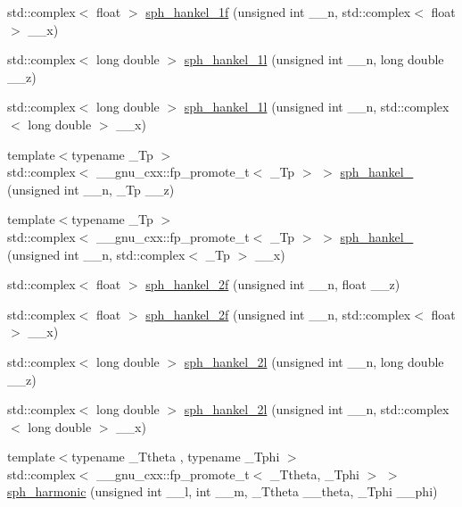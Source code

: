 \begin{DoxyCompactItemize}
std\+::complex$<$ float $>$ \hyperlink{group__gnu__math__spec__func_gadbb875cd50abb62ac75386143486bb2c}{sph\+\_\+hankel\+\_\+1f} (unsigned int \+\_\+\+\_\+n, std\+::complex$<$ float $>$ \+\_\+\+\_\+x)
\item 
std\+::complex$<$ long double $>$ \hyperlink{group__gnu__math__spec__func_ga6e77fd5cddfbd57d9120b20fc6c30e6f}{sph\+\_\+hankel\+\_\+1l} (unsigned int \+\_\+\+\_\+n, long double \+\_\+\+\_\+z)
\item 
std\+::complex$<$ long double $>$ \hyperlink{group__gnu__math__spec__func_ga3e9d889d8f2e4792e892b12b1f5948b9}{sph\+\_\+hankel\+\_\+1l} (unsigned int \+\_\+\+\_\+n, std\+::complex$<$ long double $>$ \+\_\+\+\_\+x)
\item 
{\footnotesize template$<$typename \+\_\+\+Tp $>$ }\\std\+::complex$<$ \+\_\+\+\_\+gnu\+\_\+cxx\+::fp\+\_\+promote\+\_\+t$<$ \+\_\+\+Tp $>$ $>$ \hyperlink{group__gnu__math__spec__func_ga1ca08866a25e3637b04c57ff5a0c36a5}{sph\+\_\+hankel\+\_} (unsigned int \+\_\+\+\_\+n, \+\_\+\+Tp \+\_\+\+\_\+z)
\item 
{\footnotesize template$<$typename \+\_\+\+Tp $>$ }\\std\+::complex$<$ \+\_\+\+\_\+gnu\+\_\+cxx\+::fp\+\_\+promote\+\_\+t$<$ \+\_\+\+Tp $>$ $>$ \hyperlink{group__gnu__math__spec__func_ga0e7d9b5a93ab1d1040040f0ef44590de}{sph\+\_\+hankel\+\_} (unsigned int \+\_\+\+\_\+n, std\+::complex$<$ \+\_\+\+Tp $>$ \+\_\+\+\_\+x)
\item 
std\+::complex$<$ float $>$ \hyperlink{group__gnu__math__spec__func_ga9496b81f94b8ba0162cf45df72be1e71}{sph\+\_\+hankel\+\_\+2f} (unsigned int \+\_\+\+\_\+n, float \+\_\+\+\_\+z)
\item 
std\+::complex$<$ float $>$ \hyperlink{group__gnu__math__spec__func_ga4c3194b71831b265811f987cbbf6e031}{sph\+\_\+hankel\+\_\+2f} (unsigned int \+\_\+\+\_\+n, std\+::complex$<$ float $>$ \+\_\+\+\_\+x)
\item 
std\+::complex$<$ long double $>$ \hyperlink{group__gnu__math__spec__func_ga6d3ead73a4f0bfeeb0aa1fd99daaf3b1}{sph\+\_\+hankel\+\_\+2l} (unsigned int \+\_\+\+\_\+n, long double \+\_\+\+\_\+z)
\item 
std\+::complex$<$ long double $>$ \hyperlink{group__gnu__math__spec__func_ga3d9d9aaceba455a5ddc79d178ee1cb6d}{sph\+\_\+hankel\+\_\+2l} (unsigned int \+\_\+\+\_\+n, std\+::complex$<$ long double $>$ \+\_\+\+\_\+x)
\item 
{\footnotesize template$<$typename \+\_\+\+Ttheta , typename \+\_\+\+Tphi $>$ }\\std\+::complex$<$ \+\_\+\+\_\+gnu\+\_\+cxx\+::fp\+\_\+promote\+\_\+t$<$ \+\_\+\+Ttheta, \+\_\+\+Tphi $>$ $>$ \hyperlink{group__gnu__math__spec__func_gacbff28988d5d36f0c3b3fe03d4f57896}{sph\+\_\+harmonic} (unsigned int \+\_\+\+\_\+l, int \+\_\+\+\_\+m, \+\_\+\+Ttheta \+\_\+\+\_\+theta, \+\_\+\+Tphi \+\_\+\+\_\+phi)

\end{DoxyCompactItemize}
